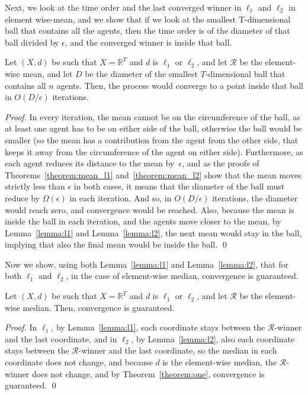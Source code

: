 \documentclass[runningheads,envcountsame]{llncs}
\begin{document}
Next, we look at the time order and the last converged winner in $\ell_1$ and $\ell_2$ in element wise-mean, and we show that if we look at the smallest T-dimensional ball that contains all the agents, then the time order is of the diameter of that ball divided by $\epsilon$, and the converged winner is inside that ball.

\begin{theorem}\label{theorem:killone}
  Let $(X, d)$ be such that $X = \mathbb{R}^T$ and $d$ is $\ell_1$ or $\ell_2$, and let $\mathcal{R}$ be the element-wise mean, and let $D$ be the diameter of the smallest $T$-dimensional ball that contains all $n$ agents. Then, the process would converge to a point inside that ball in $O(D/\epsilon)$ iterations.
\end{theorem}

\begin{proof}
%
In every iteration, the mean cannot be on the circumference of the ball, as at least one agent has to be on either side of the ball, otherwise the ball would be smaller (so the mean has a contribution from the agent from the other side, that keeps it away from the circumference of the agent on either side).
Furthermore, as each agent reduces its distance to the mean by~$\epsilon$, and as the proofs of Theorems~\ref{theorem:mean_l1} and~\ref{theorem:mean_l2} show that the mean moves strictly less than $\epsilon$ in both cases, it means that the diameter of the ball must reduce by $\Omega(\epsilon)$ in each iteration. And so, in $O(D/\epsilon)$ iterations, the diameter would reach zero, and convergence would be reached. Also, because the mean is inside the ball in each iteration, and the agents move closer to the mean, by Lemma~\ref{lemma:l1} and Lemma~\ref{lemma:l2}, the next mean would stay in the ball, implying that also the final mean would be inside the ball.
%
\qed\end{proof}

Now we show, using both Lemma~\ref{lemma:l1} and Lemma~\ref{lemma:l2}, that for both $\ell_1$ and $\ell_2$, in the case of element-wise median, convergence is guaranteed.

\begin{theorem}\label{theorem:median}
  Let $(X, d)$ be such that $X = \mathbb{R}^T$ and $d$ is $\ell_1$ or $\ell_2$, and let $\mathcal{R}$ be the element-wise median. Then, convergence is guaranteed.
\end{theorem}

\begin{proof}
  In $\ell_1$, by Lemma~\ref{lemma:l1}, each coordinate stays between the $\mathcal{R}$-winner and the last coordinate, and in $\ell_2$, by Lemma~\ref{lemma:l2}, also each coordinate stays between the $\mathcal{R}$-winner and the last coordinate, so the median in each coordinate does not change, and because $d$ is the element-wise median, the $\mathcal{R}$-winner does not change, and by Theorem~\ref{theorem:one}, convergence is guaranteed.
\qed\end{proof}
\end{document}
